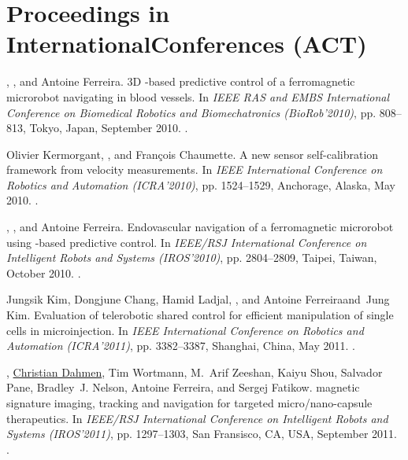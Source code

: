 \section[Proceedings]{Proceedings in International\;Conferences {\smaller(ACT)}}


\begin{Mybibliography}{10}
  \KBelharet, \DavidFolio, and Antoine Ferreira.
  \newblock 3D {\MRIshort}-based predictive control of a ferromagnetic microrobot
  navigating in blood vessels.
  \newblock In \emph{IEEE RAS and EMBS International Conference on Biomedical
    Robotics and Biomechatronics (BioRob'2010)}, pp. 808--813, Tokyo, Japan,
  September 2010.
  \newblock {}.
  
  Olivier Kermorgant, \DavidFolio, and François Chaumette.
  \newblock A new sensor self-calibration framework from velocity measurements.
  \newblock In \emph{IEEE International Conference on Robotics and Automation
    (ICRA'2010)}, pp. 1524--1529, Anchorage, Alaska, May 2010.
  \newblock {}.
  
  \KBelharet, \DavidFolio, and Antoine Ferreira.
  \newblock Endovascular navigation of a ferromagnetic microrobot using
  {\MRIshort}-based predictive control.
  \newblock In \emph{IEEE/RSJ International Conference on Intelligent Robots and
    Systems (IROS'2010)}, pp. 2804--2809, Taipei, Taiwan, October
  2010.
  \newblock {}.
  
  Jungsik Kim, Dongjune Chang, Hamid Ladjal, \DavidFolio, and Antoine
  Ferreiraand~Jung Kim.
  \newblock Evaluation of telerobotic shared control for efficient manipulation
  of single cells in microinjection.
  \newblock In \emph{IEEE International Conference on Robotics and Automation
    (ICRA'2011)}, pp. 3382--3387, Shanghai, China, May 2011.
  \newblock {}.
  
 \DavidFolio, \uline{Christian Dahmen}, Tim Wortmann, M.~Arif Zeeshan, Kaiyu Shou,
 Salvador Pane, Bradley~J. Nelson, Antoine Ferreira, and Sergej Fatikow.
 \newblock {\MRIshort} magnetic signature imaging, tracking and navigation for
 targeted micro/nano-capsule therapeutics.
 \newblock In \emph{IEEE/RSJ International Conference on Intelligent Robots and
   Systems (IROS'2011)}, pp. 1297--1303, San Fransisco, CA, USA, September
 2011.
 \newblock {}.
  

\end{Mybibliography}
